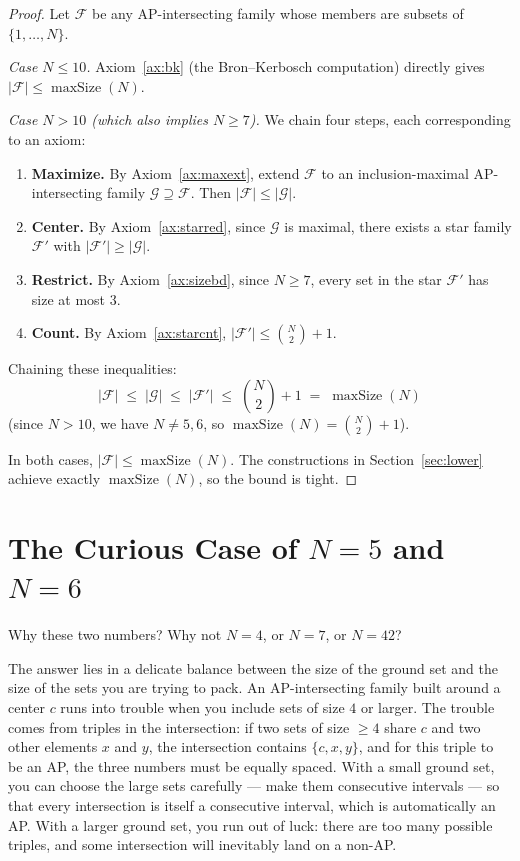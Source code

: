 \documentclass[11pt,a4paper]{article}
\theoremstyle{definition}
\newcommand{\CN}{\binom{N}{2}}
\newcommand{\ground}{\{1,\dots,N\}}
\begin{document}
\begin{proof}
Let $\mathcal{F}$ be any AP-intersecting family whose members are subsets of
$\ground$.

\medskip\noindent
\textit{Case $N \leq 10$.}
Axiom~\ref{ax:bk} (the Bron--Kerbosch computation) directly gives
$|\mathcal{F}| \leq \operatorname{maxSize}(N)$.

\medskip\noindent
\textit{Case $N > 10$ (which also implies $N \geq 7$).}
We chain four steps, each corresponding to an axiom:
\begin{enumerate}[label=(\roman*)]
    \item \textbf{Maximize.} By Axiom~\ref{ax:maxext}, extend $\mathcal{F}$ to an
          inclusion-maximal AP-intersecting family $\mathcal{G} \supseteq
          \mathcal{F}$. Then $|\mathcal{F}| \leq |\mathcal{G}|$.
    \item \textbf{Center.} By Axiom~\ref{ax:starred}, since $\mathcal{G}$ is
          maximal, there exists a star family $\mathcal{F}'$ with
          $|\mathcal{F}'| \geq |\mathcal{G}|$.
    \item \textbf{Restrict.} By Axiom~\ref{ax:sizebd}, since $N \geq 7$, every set
          in the star $\mathcal{F}'$ has size at most $3$.
    \item \textbf{Count.} By Axiom~\ref{ax:starcnt},
          $|\mathcal{F}'| \leq \CN + 1$.
\end{enumerate}
Chaining these inequalities:
\[
|\mathcal{F}| \;\leq\; |\mathcal{G}| \;\leq\; |\mathcal{F}'|
    \;\leq\; \CN + 1 \;=\; \operatorname{maxSize}(N)
\]
(since $N > 10$, we have $N \neq 5,6$, so $\operatorname{maxSize}(N) = \CN + 1$).

In both cases, $|\mathcal{F}| \leq \operatorname{maxSize}(N)$. The constructions in
Section~\ref{sec:lower} achieve exactly $\operatorname{maxSize}(N)$, so the bound is
tight.
\end{proof}

\section{The Curious Case of $N=5$ and $N=6$}

Why these two numbers? Why not $N=4$, or $N=7$, or $N=42$?

The answer lies in a delicate balance between the size of the ground set and the size
of the sets you are trying to pack. An AP-intersecting family built around a center
$c$ runs into trouble when you include sets of size $4$ or larger. The trouble comes
from triples in the intersection: if two sets of size $\geq 4$ share $c$ and two
other elements $x$ and $y$, the intersection contains $\{c, x, y\}$, and for this
triple to be an AP, the three numbers must be equally spaced. With a small ground
set, you can choose the large sets carefully --- make them consecutive intervals ---
so that every intersection is itself a consecutive interval, which is automatically
an AP. With a larger ground set, you run out of luck: there are too many possible
triples, and some intersection will inevitably land on a non-AP.
\end{document}
